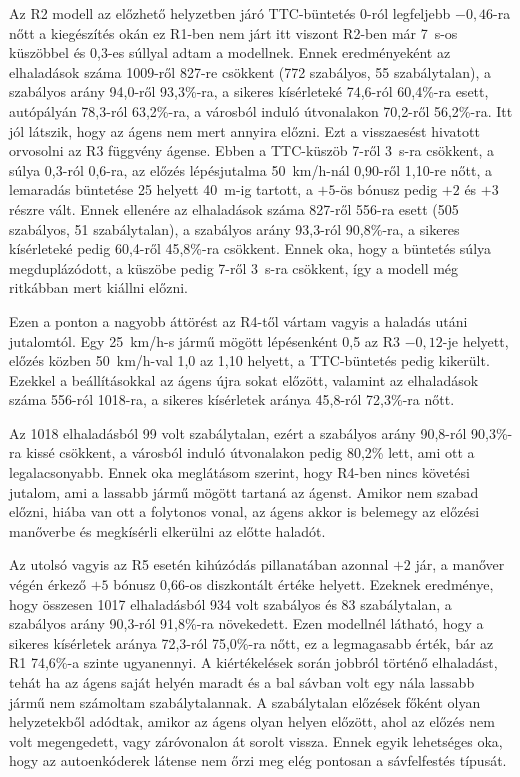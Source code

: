 \documentclass[a4paper,12pt,oneside]{article}
\begin{document}
Az R2 modell az előzhető helyzetben járó TTC-büntetés 0-ról legfeljebb $-0{,}46$-ra nőtt a 
kiegészítés okán ez R1-ben nem járt itt viszont R2-ben már 7~s-os küszöbbel és 0,3-es
súllyal adtam a modellnek. Ennek eredményeként az elhaladások száma 1009-ről 827-re csökkent (772
szabályos, 55 szabálytalan), a szabályos arány 94,0-ről 93,3\%-ra, a sikeres kísérleteké
74,6-ról 60,4\%-ra esett, autópályán 78,3-ról 63,2\%-ra, a városból induló útvonalakon
70,2-ről 56,2\%-ra. Itt jól látszik, hogy az ágens nem mert annyira előzni.
Ezt a visszaesést hivatott orvosolni az R3 függvény ágense. Ebben a TTC-küszöb 7-ről 3~s-ra csökkent, a súlya 0,3-ról 0,6-ra, az előzés
lépésjutalma 50~km/h-nál 0,90-ről 1,10-re nőtt, a lemaradás büntetése 25 helyett 40~m-ig
tartott, a $+5$-ös bónusz pedig $+2$ és $+3$ részre vált. Ennek ellenére az elhaladások
száma 827-ről 556-ra esett (505 szabályos, 51 szabálytalan), a szabályos arány
93,3-ról 90,8\%-ra, a sikeres kísérleteké pedig 60,4-ről 45,8\%-ra csökkent. Ennek oka, hogy a büntetés súlya megduplázódott, a küszöbe pedig 7-ről 3~s-ra csökkent, így a modell még ritkábban mert kiállni előzni. 

Ezen a ponton a nagyobb áttörést az R4-től vártam vagyis a haladás utáni jutalomtól.
Egy 25~km/h-s jármű mögött lépésenként 0,5 az R3 $-0{,}12$-je helyett, előzés közben
50~km/h-val 1,0 az 1,10 helyett, a TTC-büntetés pedig kikerült. Ezekkel a beállításokkal
az ágens újra sokat előzött, valamint az elhaladások száma 556-ról 1018-ra, a 
sikeres kísérletek aránya 45,8-ról 72,3\%-ra nőtt. 


Az 1018 elhaladásból 99 volt szabálytalan, ezért a szabályos arány 90,8-ról 90,3\%-ra kissé csökkent, a városból induló útvonalakon 
pedig 80,2\% lett, ami ott a legalacsonyabb. 
Ennek oka meglátásom szerint, hogy R4-ben nincs követési jutalom, ami a lassabb jármű mögött
tartaná az ágenst.
Amikor nem szabad előzni, hiába van ott a folytonos vonal, az ágens akkor is 
belemegy az előzési manőverbe és megkísérli elkerülni az előtte haladót. 

Az utolsó vagyis az R5 esetén kihúzódás pillanatában azonnal $+2$ jár, a 
manőver végén érkező $+5$ bónusz 0,66-os diszkontált értéke helyett. 
Ezeknek eredménye, hogy összesen 1017 elhaladásból 934 volt szabályos és
83 szabálytalan, a szabályos arány 90,3-ról 91,8\%-ra növekedett. 
Ezen modellnél látható, hogy a sikeres kísérletek aránya 72,3-ról 75,0\%-ra nőtt, 
ez a legmagasabb érték, bár az R1 74,6\%-a szinte ugyanennyi. 
A kiértékelések során jobbról történő elhaladást, tehát ha az ágens saját helyén maradt
és a bal sávban volt egy nála lassabb jármű nem számoltam szabálytalannak.
A szabálytalan előzések
főként olyan helyzetekből adódtak, amikor az ágens olyan helyen előzött, 
ahol az előzés nem volt megengedett, vagy záróvonalon
át sorolt vissza. Ennek egyik lehetséges oka, hogy az autoenkóderek látense nem őrzi meg elég pontosan a sávfelfestés típusát. 
\end{document}

